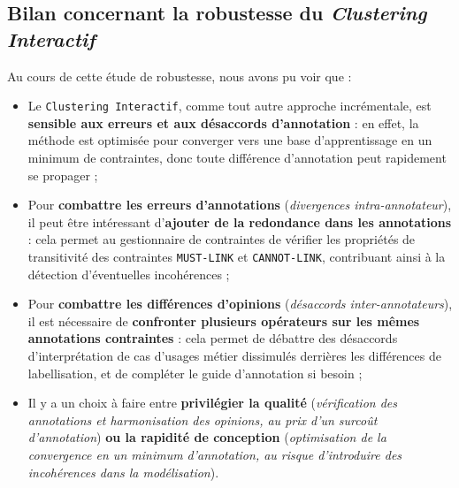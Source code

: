 	
	\subsection{Bilan concernant la robustesse du \textit{Clustering Interactif}}
	\label{section:4.6.4-ETUDE-ROBUSTESSE-MISE-EN-COMMUN}
	
		\begin{leftBarSummary}
			Au cours de cette étude de robustesse, nous avons pu voir que :
			\begin{itemize}
				\item[\itemok] Le \texttt{Clustering Interactif}, comme tout autre approche incrémentale, est \textbf{sensible aux erreurs et aux désaccords d'annotation} : en effet, la méthode est optimisée pour converger vers une base d'apprentissage en un minimum de contraintes, donc toute différence d'annotation peut rapidement se propager ;
				\item[\itemok] Pour \textbf{combattre les erreurs d'annotations} (\textit{divergences intra-annotateur}), il peut être intéressant d'\textbf{ajouter de la redondance dans les annotations} : cela permet au gestionnaire de contraintes de vérifier les propriétés de transitivité des contraintes \texttt{MUST-LINK} et \texttt{CANNOT-LINK}, contribuant ainsi à la détection d'éventuelles incohérences ;
				\item[\itemok] Pour \textbf{combattre les différences d'opinions} (\textit{désaccords inter-annotateurs}), il est nécessaire de \textbf{confronter plusieurs opérateurs sur les mêmes annotations contraintes} : cela permet de débattre des désaccords d'interprétation de cas d'usages métier dissimulés derrières les différences de labellisation, et de compléter le guide d'annotation si besoin ;
				\item[\itemok] Il y a un choix à faire entre \textbf{privilégier la qualité} (\textit{vérification des annotations et harmonisation des opinions, au prix d'un surcoût d'annotation}) \textbf{ou la rapidité de conception} (\textit{optimisation de la convergence en un minimum d'annotation, au risque d'introduire des incohérences dans la modélisation}).
			\end{itemize}
		\end{leftBarSummary}